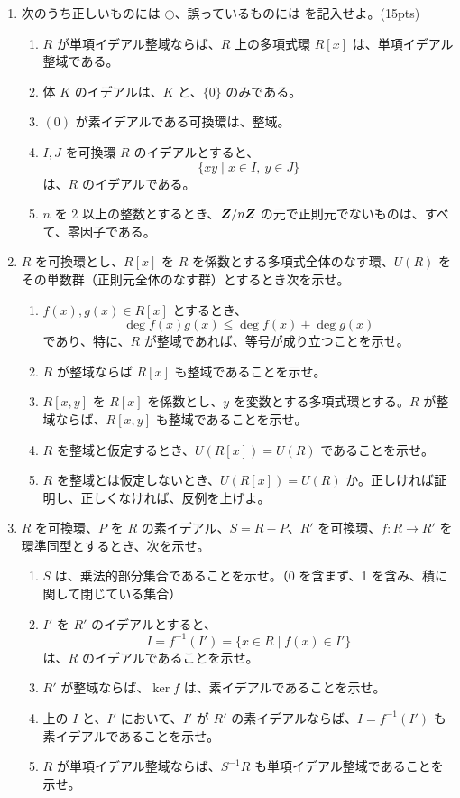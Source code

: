 \begin{enumerate}
\item 次のうち正しいものには $\bigcirc$、誤っているものには \bigx を記入せよ。(15pts)
     \begin{enumerate}
     \item $R$ が単項イデアル整域ならば、$R$ 上の多項式環 $R[x]$ は、単項イデアル整域である。
     \item 体 $K$ のイデアルは、$K$ と、$\{0\}$ のみである。
     \item $(0)$ が素イデアルである可換環は、整域。
     \item $I, J$ を可換環 $R$ のイデアルとすると、
     $$\{xy\mid x\in I, \:y\in J\}$$
     は、$R$ のイデアルである。
     \item $n$ を $2$ 以上の整数とするとき、$\mbox{\boldmath $Z$}/n\mbox{\boldmath $Z$}$ の元で正則元でないものは、すべて、零因子である。
     \end{enumerate}

\item $R$ を可換環とし、$R[x]$ を $R$ を係数とする多項式全体のなす環、$U(R)$ をその単数群（正則元全体のなす群）とするとき次を示せ。
     \begin{enumerate}
     \item $f(x), g(x)\in R[x]$ とするとき、
     $$\deg f(x)g(x) \leq \deg f(x) + \deg g(x)$$
     であり、特に、$R$ が整域であれば、等号が成り立つことを示せ。
     \item $R$ が整域ならば $R[x]$ も整域であることを示せ。
     \item $R[x,y]$ を $R[x]$ を係数とし、$y$ を変数とする多項式環とする。$R$ が整域ならば、$R[x,y]$ も整域であることを示せ。
     \item $R$ を整域と仮定するとき、$U(R[x]) = U(R)$ であることを示せ。
     \item $R$ を整域とは仮定しないとき、$U(R[x]) = U(R)$ か。正しければ証明し、正しくなければ、反例を上げよ。
     \end{enumerate}
 
\item $R$ を可換環、$P$ を $R$ の素イデアル、$S = R - P$、$R'$ を可換環、$f:R\to R'$ を環準同型とするとき、次を示せ。
     \begin{enumerate}
     \item $S$ は、乗法的部分集合であることを示せ。（0 を含まず、1 を含み、積に関して閉じている集合）
     \item $I'$ を $R'$ のイデアルとすると、
     $$I = f^{-1}(I') = \{x\in R\mid f(x)\in I'\}$$
     は、$R$ のイデアルであることを示せ。
     \item $R'$ が整域ならば、$\ker f$ は、素イデアルであることを示せ。
     \item 上の $I$ と、$I'$ において、$I'$ が $R'$ の素イデアルならば、$I = f^{-1}(I')$ も素イデアルであることを示せ。
     \item $R$ が単項イデアル整域ならば、$S^{-1}R$ も単項イデアル整域であることを示せ。
          \end{enumerate}
         

\end{enumerate}
